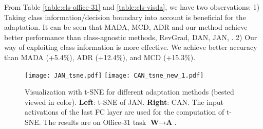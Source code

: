 \documentclass[10pt,twocolumn,letterpaper]{article}
\begin{document}
From Table \ref{table:cls-office-31} and \ref{table:cls-visda}, we have two observations:
1) Taking class information/decision boundary into account is beneficial for the adaptation.
It can be seen that MADA, MCD, ADR and our method achieve
better performance than 
class-agnostic methods, 
\eg RevGrad, DAN, JAN, \etc.
2) Our way of exploiting class information is more effective. 
We achieve better accuracy than MADA (+5.4\%), ADR (+12.4\%), and MCD (+15.3\%).



































\begin{figure}[t]
\begin{center}
\texttt{[image: JAN\_tsne.pdf]}
\qquad
\texttt{[image: CAN\_tsne\_new\_1.pdf]}
\end{center}
\caption{\label{fig:tsne}
Visualization with t-SNE for different adaptation methods (bested viewed in color). \textbf{Left}: t-SNE of JAN. \textbf{Right}: CAN. The input activations of the last FC layer are used for the computation of t-SNE. The results are on Office-31 task $\textbf{W} \rightarrow \textbf{A}$.
}
\vspace{-4mm}
\end{figure}


\begin{figure*}[t]
\begin{center}
\par
{}
\end{center}
\vspace{-3mm}
\caption{\label{fig:metric-train}
(a-b) The curve of CDD and accuracy during training on task $\textbf{A} \rightarrow \textbf{D}$ of the Office-31 dataset.
The ``CDD-G" denotes the contrastive domain discrepancy computed with ground-truth target labels.
(c-d) The sensitivity of accuracy of CAN to $\beta$.
The results for $\textbf{A} \rightarrow \textbf{D}$ (Left)
and $\textbf{D} \rightarrow \textbf{A}$ (Right)
are illustrated as examples. The trends for other tasks are similar.
}
\vspace{-3mm}
\end{figure*}
\end{document}
